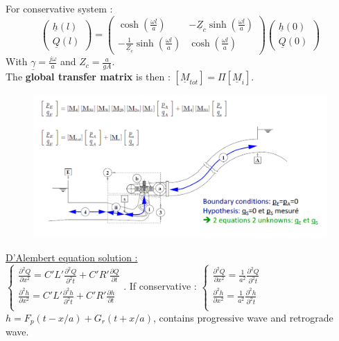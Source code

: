 \documentclass[../main.tex]{subfiles}
\begin{document}
For conservative system : 
\begin{equation}
    \begin{pmatrix}
        \underline{h}(l)\\ \underline{Q}(l) 
    \end{pmatrix} = \begin{pmatrix}
        \cosh(\frac{\omega l}{a}) & -\underline{Z}_c \sinh(\frac{\omega l}{a})\\
        -\frac{1}{\underline{Z}_c} \sinh(\frac{\omega l}{a}) & \cosh(\frac{\omega l}{a})
    \end{pmatrix} \begin{pmatrix}
        \underline{h}(0)\\ \underline{Q}(0)
    \end{pmatrix}
\end{equation}
With $\underline{\gamma} = \frac{j \omega}{a}$ and $Z_c = \frac{a}{gA}$.\\

The \textbf{global transfer matrix} is then : $[\underline{M}_{tot}] = \Pi [\underline{M}_i]$.\\

\begin{figure}[hbt!]
    \centering
    \includegraphics[width=0.5\linewidth]{IMAGES/Hydraulic/Screenshot from 2025-03-07 10-43-44.png}
\end{figure}

\quad \underline{D'Alembert equation solution :}\\
$\begin{cases}
    \frac{\partial^2 Q}{\partial x^2} = C' L' \frac{\partial^2 Q}{\partial^2 t} + C'R' \frac{\partial Q}{\partial t}\\
    \frac{\partial^2 h}{\partial x^2} = C' L' \frac{\partial^2 h}{\partial^2 t} + C'R' \frac{\partial h}{\partial t}\\
\end{cases}$. If conservative : $\begin{cases}
    \frac{\partial^2 Q}{\partial x^2} = \frac{1}{a^2} \frac{\partial^2 Q}{\partial^2 t}\\
    \frac{\partial^2 h}{\partial x^2} = \frac{1}{a^2} \frac{\partial^2 h}{\partial^2 t}\\
\end{cases}$
$h = F_p(t-x/a) + G_r(t+x/a)$, contains progressive wave and retrograde wave.\\
\end{document}
